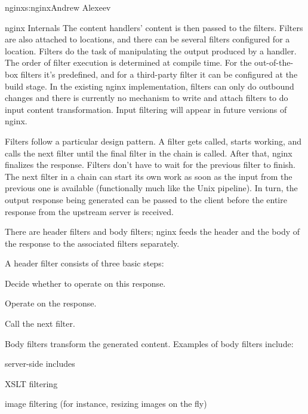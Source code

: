 \begin{aosachapter}{nginx}{s:nginx}{Andrew Alexeev}
\begin{aosasect1}{nginx Internals}
The content handlers' content is then passed to the filters. Filters
are also attached to locations, and there can be several filters
configured for a location. Filters do the task of manipulating the
output produced by a handler. The order of filter execution is
determined at compile time. For the out-of-the-box filters it's
predefined, and for a third-party filter it can be configured at the
build stage. In the existing nginx implementation, filters can only do
outbound changes and there is currently no mechanism to write and
attach filters to do input content transformation. Input filtering
will appear in future versions of nginx.

Filters follow a particular design pattern. A filter gets called,
starts working, and calls the next filter until the final filter in
the chain is called. After that, nginx finalizes the response. Filters
don't have to wait for the previous filter to finish. The next filter
in a chain can start its own work as soon as the input from the
previous one is available (functionally much like the Unix
pipeline). In turn, the output response being generated can be passed
to the client before the entire response from the upstream server is
received.

There are header filters and body filters; nginx feeds the header and
the body of the response to the associated filters separately.

A header filter consists of three basic steps:

\begin{aosaenumerate}

\item Decide whether to operate on this response.

\item Operate on the response.

\item Call the next filter.

\end{aosaenumerate}

\noindent Body filters transform the generated content. Examples of body filters
include:

\begin{aosaitemize}

\item server-side includes

\item XSLT filtering

\item image filtering (for instance, resizing images on the fly)


\end{aosaitemize}
\end{aosasect1}
\end{aosachapter}
